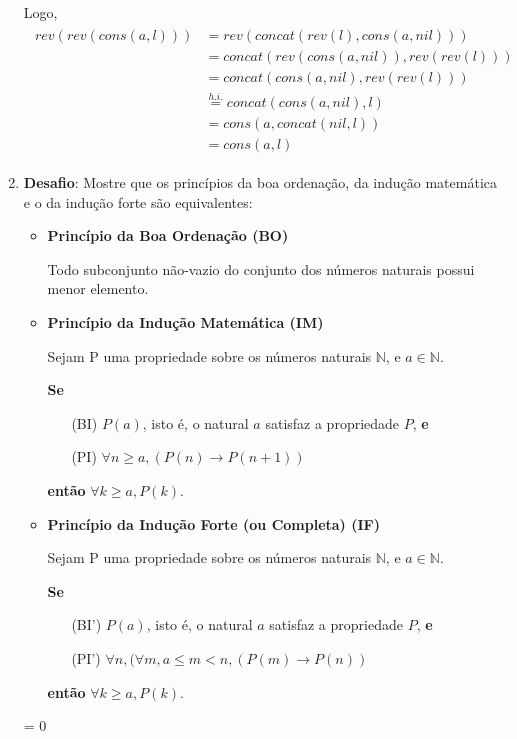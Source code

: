 \documentclass[a4paper]{article}
\newcommand{\answer}[2]{\ifnum#1= 0  {\color{blue} #2}\else \fi}
\begin{document}
\begin{enumerate}
{    Logo,
    \begin{align*}
      \begin{split}
        rev(rev(cons(a,l))) &= rev(concat(rev(l),cons(a,nil)))\\
        &= concat(rev(cons(a,nil)),rev(rev(l)))\\
        &= concat(cons(a,nil),rev(rev(l)))\\
        &\stackrel{h.i.}{=} concat(cons(a,nil),l)\\
        &= cons(a,concat(nil,l))\\
        &= cons(a,l)
      \end{split}
    \end{align*}
  }
  
\item {\bf Desafio}: Mostre que os princípios da boa ordenação, da indução
  matemática e o da indução forte são equivalentes:
  
  \begin{itemize}
  \item {\bf Princípio da Boa Ordenação (BO)}
    
    Todo subconjunto não-vazio do conjunto dos números naturais
    possui menor elemento.
    
  \item {\bf Princípio da Indução Matemática (IM)}
    
    Sejam P uma propriedade sobre os números naturais $\mathbb{N}$, e
    $a\in \mathbb{N}$.

    {\bf Se}
    \begin{enumerate}
    \item[(BI)] $P(a)$, isto é, o natural $a$ satisfaz a propriedade $P$, {\bf e}
    \item[(PI)] $\forall n\geq a, (P(n) \to P(n+1))$
    \end{enumerate}
    {\bf então} $\forall k\geq a, P(k)$.
    
  \item {\bf Princípio da Indução Forte (ou Completa) (IF)}

    Sejam P uma propriedade sobre os números naturais $\mathbb{N}$, e
    $a\in \mathbb{N}$.
    
    {\bf Se}
    \begin{enumerate}
    \item[(BI')] $P(a)$, isto é, o natural $a$ satisfaz a propriedade $P$, {\bf e}
    \item[(PI')] $\forall n, (\forall m, a\leq m < n, (P(m) \to P(n))$
    \end{enumerate}
    {\bf então} $\forall k\geq a, P(k)$.    
  \end{itemize}
  \answer{0}{

}
\end{enumerate}
\end{document}
